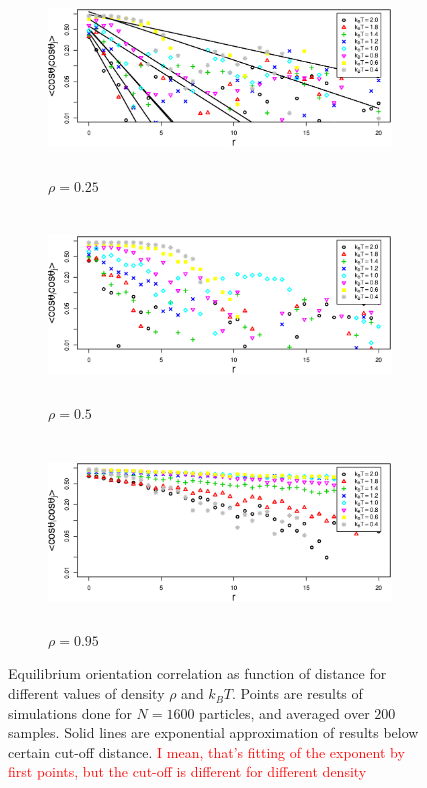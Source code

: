 \begin{figure}[p]
	\centering
	\begin{subfigure}{\textwidth}
	\centering
		\includegraphics[height = 5cm]{Images/correlations_025}
		\captionsetup{justification=centering, width=0.9\columnwidth}
		\caption{$\rho = 0.25$}
	\end{subfigure}
	\begin{subfigure}{\textwidth}
	\centering
		\includegraphics[height = 5cm]{Images/correlations_05}
		\captionsetup{justification=centering, width=0.9\columnwidth}
		\caption{$\rho = 0.5$}
	\end{subfigure}
	\begin{subfigure}{\textwidth}
	\centering
		\includegraphics[height = 5cm]{Images/correlations_095}
		\captionsetup{justification=centering, width=0.9\columnwidth}
		\caption{$\rho = 0.95$}
	\end{subfigure}
	\captionsetup{justification=centering, width=0.9\columnwidth}
	\caption{Equilibrium orientation correlation as function of distance for different values of density $\rho$ and $k_BT$. Points are results of simulations done for $N = 1600$ particles, and averaged over $200$ samples. Solid lines are exponential approximation of results below certain cut-off distance. \textcolor{red}{I mean, that's fitting of the exponent by first points, but the cut-off is different for different density}}
	\label{fig:correlation_equilibrium}
\end{figure}

